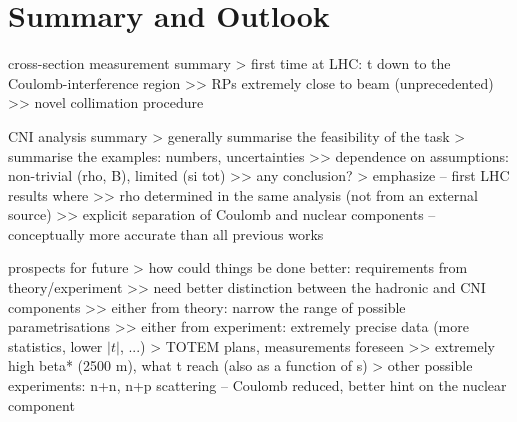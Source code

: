 \section{Summary and Outlook}

\> cross-section measurement summary
\>> first time at LHC: t down to the Coulomb-interference region
\>>> RPs extremely close to beam (unprecedented)
\>>> novel collimation procedure


\> CNI analysis summary
\>> generally summarise the feasibility of the task
\>> summarise the examples: numbers, uncertainties
\>>> dependence on assumptions: non-trivial (rho, B), limited (si tot)
\>>> any conclusion?
\>> emphasize -- first LHC results where
\>>> rho determined in the same analysis (not from an external source)
\>>> explicit separation of Coulomb and nuclear components -- conceptually more accurate than all previous works


\> prospects for future
\>> how could things be done better: requirements from theory/experiment
\>>> need better distinction between the hadronic and CNI components
\>>> either from theory: narrow the range of possible parametrisations
\>>> either from experiment: extremely precise data (more statistics, lower $|t|$, ...)
\>> TOTEM plans, measurements foreseen
\>>> extremely high beta* (2500 m), what t reach (also as a function of s)
\>> other possible experiments: n+n, n+p scattering -- Coulomb reduced, better hint on the nuclear component
